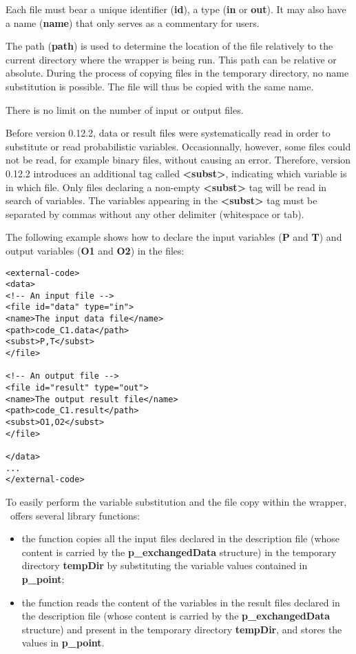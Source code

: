 Each file must bear a unique identifier ({\bf id}), a type ({\bf in} or {\bf out}). It may also have a name ({\bf name}) that only serves as a commentary for users.

The path ({\bf path}) is used to determine the location of the file relatively to the current directory where the wrapper is being run. This path can be relative or absolute. During the process of copying files in the temporary directory, no name substitution is possible. The file will thus be copied with the same name.

There is no limit on the number of input or output files.

Before version 0.12.2, data or result files were systematically read in order to substitute or read probabilistic variables. Occasionnally, however, some files could not be read, for example binary files, without causing an error. Therefore, version 0.12.2 introduces an additional tag called {\bf <subst>}, indicating which variable is in which file. Only files declaring a non-empty {\bf <subst>} tag will be read in search of variables. The variables appearing in the {\bf <subst>} tag must be separated by commas without any other delimiter (whitespace or tab).

The following example shows how to declare the input variables ({\bf P} and {\bf T}) and output variables ({\bf O1} and {\bf O2}) in the files:

\lstset{language=XML, basicstyle=\normalsize}
\begin{lstlisting}[frame=TBRL]
<external-code>
<data>
<!-- An input file -->
<file id="data" type="in">
<name>The input data file</name>
<path>code_C1.data</path>
<subst>P,T</subst>
</file>

<!-- An output file -->
<file id="result" type="out">
<name>The output result file</name>
<path>code_C1.result</path>
<subst>O1,O2</subst>
</file>

</data>
...
</external-code>
\end{lstlisting}

To easily perform the variable substitution and the file copy within the wrapper, \OT\ offers several library functions:
\begin{itemize}
\item the  function copies all the input files declared in the description file (whose content is carried by the {\bf p\_exchangedData} structure) in the temporary directory {\bf tempDir} by substituting the variable values contained in {\bf p\_point};
\item the  function reads the content of the variables in the result files declared in the description file (whose content is carried by the {\bf p\_exchangedData} structure) and present in the temporary directory {\bf tempDir}, and stores the values in {\bf p\_point}.
\end{itemize}

